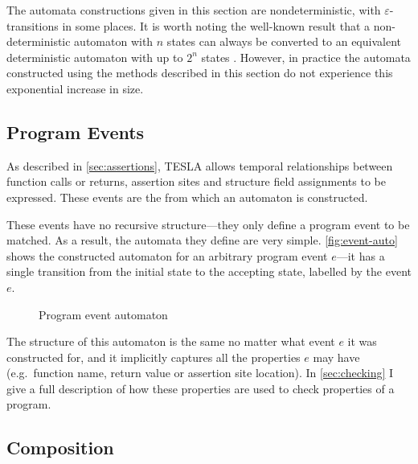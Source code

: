 The automata constructions given in this section are nondeterministic, with
$\varepsilon$-transitions in some places. It is worth noting the well-known
result that a non-deterministic automaton with $n$ states can always be
converted to an equivalent deterministic automaton with up to $2^n$ states
\cite{rabin_finite_1959}. However, in practice the automata constructed using
the methods described in this section do not experience this exponential
increase in size.

\subsection{Program Events}

As described in \autoref{sec:assertions}, TESLA allows temporal relationships
between function calls or returns, assertion sites and structure field
assignments to be expressed. These events are the 
from which an automaton is constructed.

These events have no recursive structure---they only define a program event to
be matched. As a result, the automata they define are very simple.
\autoref{fig:event-auto} shows the constructed automaton for an arbitrary program event
$e$---it has a single transition from the initial state to the accepting state,
labelled by the event $e$.

\begin{figure}[ht]
  \centering
  \caption{Program event automaton}
  \label{fig:event-auto}
\end{figure}

The structure of this automaton is the same no matter what event $e$ it was
constructed for, and it implicitly captures all the properties $e$ may have
(e.g.\ function name, return value or assertion site location). In
\autoref{sec:checking} I give a full description of how these properties are
used to check properties of a program.

\subsection{Composition}

